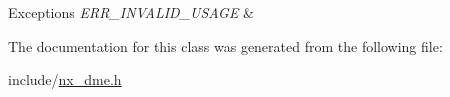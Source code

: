 \begin{DoxyExceptions}{Exceptions}
{\em E\+R\+R\+\_\+\+I\+N\+V\+A\+L\+I\+D\+\_\+\+U\+S\+A\+GE} & \\
\hline
\end{DoxyExceptions}


The documentation for this class was generated from the following file\+:\begin{DoxyCompactItemize}
\item 
include/\mbox{\hyperlink{nx__dme_8h}{nx\+\_\+dme.\+h}}\end{DoxyCompactItemize}
